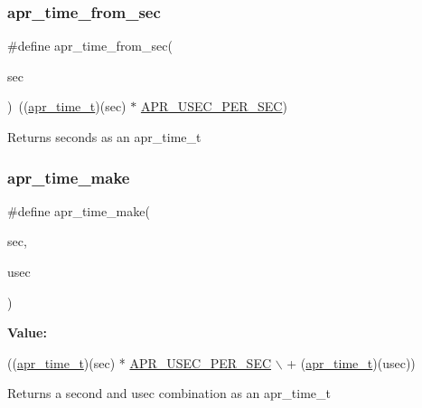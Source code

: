 \subsubsection{\texorpdfstring{apr\+\_\+time\+\_\+from\+\_\+sec}{apr\_time\_from\_sec}}
{\footnotesize\ttfamily \#define apr\+\_\+time\+\_\+from\+\_\+sec(\begin{DoxyParamCaption}\item[{}]{sec }\end{DoxyParamCaption})~((\mbox{\hyperlink{group__apr__time_gadb4bde16055748190eae190c55aa02bb}{apr\+\_\+time\+\_\+t}})(sec) $\ast$ \mbox{\hyperlink{group__apr__time_gab4dd3f3015d25a50f3be3e0e91043abf}{A\+P\+R\+\_\+\+U\+S\+E\+C\+\_\+\+P\+E\+R\+\_\+\+S\+EC}})}

\begin{DoxyReturn}{Returns}
seconds as an apr\+\_\+time\+\_\+t 
\end{DoxyReturn}
\mbox{\label{group__apr__time_ga47e8d04826e56b6ce39ed082d33abc38}} 
\subsubsection{\texorpdfstring{apr\+\_\+time\+\_\+make}{apr\_time\_make}}
{\footnotesize\ttfamily \#define apr\+\_\+time\+\_\+make(\begin{DoxyParamCaption}\item[{}]{sec,  }\item[{}]{usec }\end{DoxyParamCaption})}

{\bfseries Value\+:}
\begin{DoxyCode}
((\mbox{\hyperlink{group__apr__time_gadb4bde16055748190eae190c55aa02bb}{apr\_time\_t}})(sec) * \mbox{\hyperlink{group__apr__time_gab4dd3f3015d25a50f3be3e0e91043abf}{APR\_USEC\_PER\_SEC}} \(\backslash\)
                                + (\mbox{\hyperlink{group__apr__time_gadb4bde16055748190eae190c55aa02bb}{apr\_time\_t}})(usec))
\end{DoxyCode}
\begin{DoxyReturn}{Returns}
a second and usec combination as an apr\+\_\+time\+\_\+t 
\end{DoxyReturn}
\mbox{\label{group__apr__time_ga05d6c6ea507b74605aa2149a4410076f}} 
